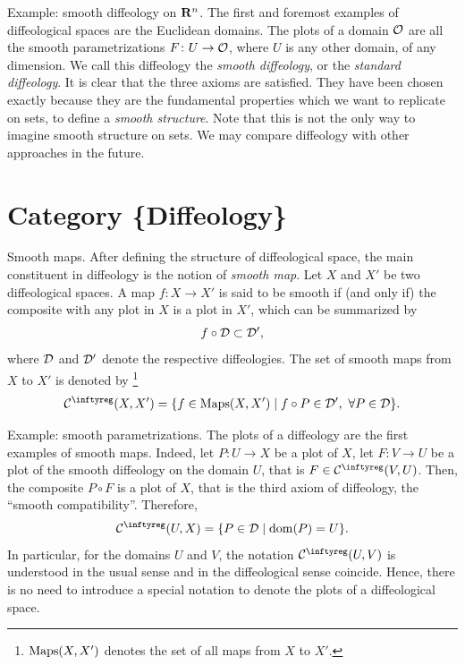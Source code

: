\begin{Article}{Example: smooth diffeology on $\mathbf{R}^n$.}
  The first and foremost examples of diffeological spaces are the Euclidean domains.
  The plots of a domain $\mathcal{O}$ are all the smooth parametrizations $F \colon U \to \mathcal{O}$,
  where $U$ is any other domain,
  of any dimension.
  We call this diffeology the \emph{smooth diffeology},
  or the \emph{standard diffeology}.
  It is clear that the three axioms are satisfied.
  They have been chosen exactly because they are the fundamental properties which we want to replicate on sets,
  to define a \emph{smooth structure}.
  Note that this is not the only way to imagine smooth structure on sets.
  We may compare diffeology with other approaches in the future.
\end{Article}

\section{Category \{Diffeology\}}

\begin{Article}{Smooth maps.}
  After defining the structure of diffeological space,
  the main constituent in diffeology is the notion of \emph{smooth map}.
  Let $X$ and $X'$ be two diffeological spaces.
  A map $f \colon X \to X'$ is said to be smooth if (and only if) the composite with any plot in $X$ is a plot in $X'$,
  which can be summarized by
  $$%
    f \circ \cD\subset \cD',
    $$%
  where $\mathcal{D}$ and $\mathcal{D}'$ denote the respective diffeologies.
  The set of smooth maps from $X$ to $X'$ is denoted by%
  \footnote{$\mathrm{Maps}(X,X')$ denotes the set of all maps from $X$ to $X'$.}
  $$%
    \Cinfty(X,X') = \{f \in \Maps(X,X') \mid f \circ P \in \cD', \ \forall P \in \cD \}.
    $$%
\end{Article}

\begin{Article}{Example: smooth parametrizations.}
  The plots of a diffeology are the first examples of smooth maps.
  Indeed,
  let $P \colon U \to X$ be a plot of $X$,
  let $F \colon V \to U$ be a plot of the smooth diffeology on the domain $U$,
  that is $F \in \Cinfty(V,U)$.
  Then,
  the composite $P \circ F$ is a plot of $X$,
  that is the third axiom of diffeology,
  the ``smooth compatibility''.
  Therefore,
  $$%
    \Cinfty(U,X) = \{ P \in \cD \mid \Domain(P) = U \}.
    $$%
  In particular,
  for the domains $U$ and $V$,
  the notation $\Cinfty(U,V)$ is understood in the usual sense and in the diffeological sense coincide.
  Hence,
  there is no need to introduce a special notation to denote the plots of a diffeological space.
\end{Article}

